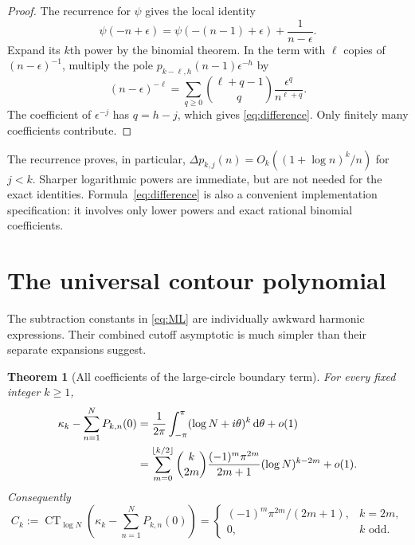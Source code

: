 \documentclass[11pt,a4paper]{article}
\numberwithin{equation}{section}
\newtheorem{theorem}{Theorem}[section]
\theoremstyle{definition}
\theoremstyle{remark}
\DeclareMathOperator{\CT}{CT}
\newcommand{\dd}{\mathrm d}
\begin{document}
\begin{proof}
The recurrence for $\psi$ gives the local identity
\[
 \psi(-n+\epsilon)=\psi(-(n-1)+\epsilon)+\frac1{n-\epsilon}.
\]
Expand its $k$th power by the binomial theorem.  In the term with
$\ell$ copies of $(n-\epsilon)^{-1}$, multiply the pole
$p_{k-\ell,h}(n-1)\epsilon^{-h}$ by
\[
 (n-\epsilon)^{-\ell}
   =\sum_{q\ge0}\binom{\ell+q-1}{q}
                       \frac{\epsilon^q}{n^{\ell+q}}.
\]
The coefficient of $\epsilon^{-j}$ has $q=h-j$, which gives
\eqref{eq:difference}.  Only finitely many coefficients contribute.
\end{proof}

The recurrence proves, in particular,
$\Delta p_{k,j}(n)=O_k((1+\log n)^k/n)$ for $j<k$.
Sharper logarithmic powers are immediate, but are not needed for the
exact identities.  Formula~\eqref{eq:difference} is also a convenient
implementation specification: it involves only lower powers and exact
rational binomial coefficients.

\section{The universal contour polynomial}
\label{sec:contour}

The subtraction constants in \eqref{eq:ML} are individually awkward
harmonic expressions.  Their combined cutoff asymptotic is much
simpler than their separate expansions suggest.

\begin{theorem}[All coefficients of the large-circle boundary term]
\label{thm:contour}
For every fixed integer $k\ge1$,
\begin{align}
 \kappa_k-\sum_{n=1}^N P_{k,n}(0)
 &=\frac1{2\pi}\int_{-\pi}^{\pi}
                         (\log N+i\theta)^k\,\dd\theta+o(1)
 \notag\\
 &=\sum_{m=0}^{\lfloor k/2\rfloor}
   \binom{k}{2m}\frac{(-1)^m\pi^{2m}}{2m+1}
                      (\log N)^{k-2m}+o(1).
 \label{eq:contour-polynomial}
\end{align}
Consequently
\begin{equation}
 C_k:=\CT_{\log N}\left(\kappa_k-\sum_{n=1}^N P_{k,n}(0)\right)
 =\begin{cases}
  (-1)^m\pi^{2m}/(2m+1),&k=2m,\\
  0,&k\text{ odd}.
 \end{cases}
 \label{eq:Ck}
\end{equation}
\end{theorem}
\end{document}
